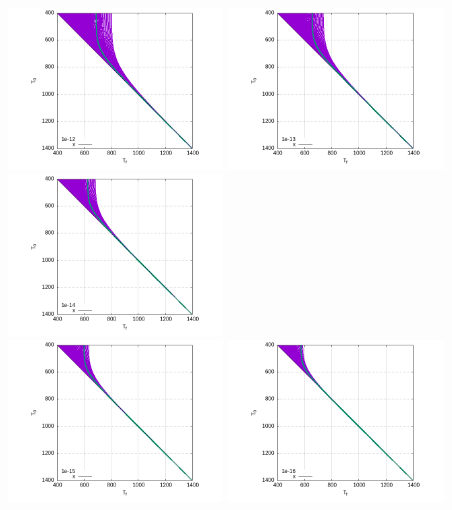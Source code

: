 \begin{center}
\includegraphics[width=5.7cm]{python_codes/fieldstone_167/gltu95/envelopes/fig6_12.png}
\includegraphics[width=5.7cm]{python_codes/fieldstone_167/gltu95/envelopes/fig6_13.png}
\includegraphics[width=5.7cm]{python_codes/fieldstone_167/gltu95/envelopes/fig6_14.png}\\
\includegraphics[width=5.7cm]{python_codes/fieldstone_167/gltu95/envelopes/fig6_15.png}
\includegraphics[width=5.7cm]{python_codes/fieldstone_167/gltu95/envelopes/fig6_16.png}
\end{center}

